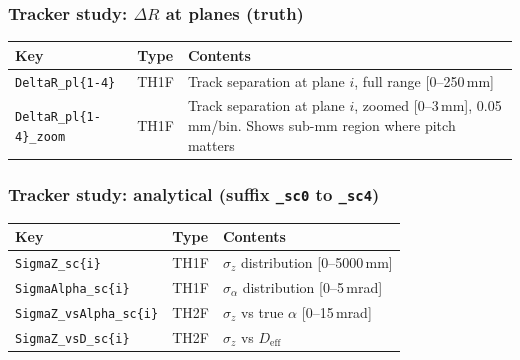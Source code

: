 \documentclass[11pt]{article}
\begin{document}
\subsubsection*{Tracker study: $\Delta R$ at planes (truth)}
\begin{longtable}{p{4.5cm}lp{6cm}}
\toprule
Key & Type & Contents \\
\midrule
\texttt{DeltaR\_pl\{1-4\}} & TH1F & Track separation at plane $i$, full range [0--250\,mm] \\
\texttt{DeltaR\_pl\{1-4\}\_zoom} & TH1F & Track separation at plane $i$, zoomed [0--3\,mm],
                                           0.05\,mm/bin. Shows sub-mm region where pitch matters \\
\bottomrule
\end{longtable}

\subsubsection*{Tracker study: analytical (suffix \texttt{\_sc0} to \texttt{\_sc4})}
\begin{longtable}{p{4.5cm}lp{6cm}}
\toprule
Key & Type & Contents \\
\midrule
\texttt{SigmaZ\_sc\{i\}} & TH1F & $\sigma_z$ distribution [0--5000\,mm] \\
\texttt{SigmaAlpha\_sc\{i\}} & TH1F & $\sigma_\alpha$ distribution [0--5\,mrad] \\
\texttt{SigmaZ\_vsAlpha\_sc\{i\}} & TH2F & $\sigma_z$ vs true $\alpha$ [0--15\,mrad] \\
\texttt{SigmaZ\_vsD\_sc\{i\}} & TH2F & $\sigma_z$ vs $D_\text{eff}$ \\
\bottomrule
\end{longtable}
\end{document}
